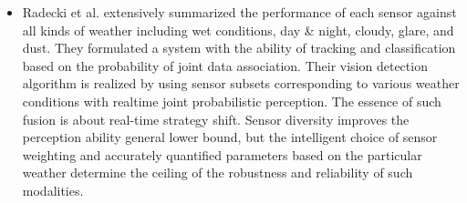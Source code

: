 \documentclass[rnd]{mas_proposal}
\begin{document}
\begin{itemize}
    \item Radecki et al. \cite{radecki2016all} extensively summarized the performance of each sensor against all kinds of weather including wet conditions, day \& night, cloudy, glare, and dust. They formulated a system with the ability of tracking and classification based on the probability of joint data association. Their vision detection algorithm is realized by using sensor subsets corresponding to various weather conditions with realtime joint probabilistic perception. The essence of such fusion is about real-time strategy shift. Sensor diversity improves the perception ability general lower bound, but the intelligent choice of sensor weighting and accurately quantified parameters based on the particular weather determine the ceiling of the robustness and reliability of such modalities. 


\end{itemize}
\end{document}

